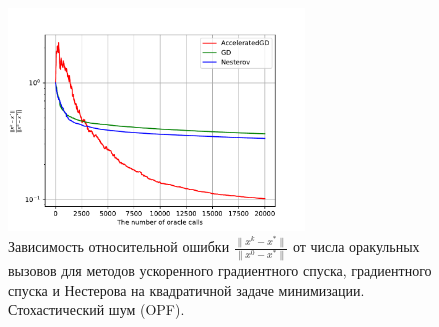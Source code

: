\documentclass{article}
\begin{document}
\begin{figure}[!htbp]
\centering
  \includegraphics[width=0.7\textwidth]{../figures/Stochastic_quadratic_AGD_GD_Nesterov_18.pdf}
 \caption{Зависимость относительной ошибки $\frac{\|x^k - x^*\|}{\|x^0 - x^*\|}$ от числа оракульных вызовов для методов ускоренного градиентного спуска, градиентного спуска и Нестерова на квадратичной задаче минимизации. Стохастический шум (OPF).}
  \label{fig:stochastic_quadratic}
\end{figure}
\end{document}
